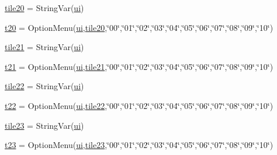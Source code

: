\begin{DoxyCompactItemize}
\item 
\mbox{\hyperlink{namespacegui_a2096e825e084bbcf0aa95f3d23080035}{tile20}} = String\+Var(\mbox{\hyperlink{namespacegui_a40ab7281456eadbea2dc2038f5c24fa1}{ui}})
\item 
\mbox{\hyperlink{namespacegui_a007d194e3cc41d5c441d2839bcc37e82}{t20}} = Option\+Menu(\mbox{\hyperlink{namespacegui_a40ab7281456eadbea2dc2038f5c24fa1}{ui}},\mbox{\hyperlink{namespacegui_a2096e825e084bbcf0aa95f3d23080035}{tile20}},\char`\"{}00\char`\"{},\char`\"{}01\char`\"{},\char`\"{}02\char`\"{},\char`\"{}03\char`\"{},\char`\"{}04\char`\"{},\char`\"{}05\char`\"{},\char`\"{}06\char`\"{},\char`\"{}07\char`\"{},\char`\"{}08\char`\"{},\char`\"{}09\char`\"{},\char`\"{}10\char`\"{})
\item 
\mbox{\hyperlink{namespacegui_a498c43445669c1b252d5fcaab91b94d1}{tile21}} = String\+Var(\mbox{\hyperlink{namespacegui_a40ab7281456eadbea2dc2038f5c24fa1}{ui}})
\item 
\mbox{\hyperlink{namespacegui_a5966de5cb8f4ee1c0c9351cc875b9ade}{t21}} = Option\+Menu(\mbox{\hyperlink{namespacegui_a40ab7281456eadbea2dc2038f5c24fa1}{ui}},\mbox{\hyperlink{namespacegui_a498c43445669c1b252d5fcaab91b94d1}{tile21}},\char`\"{}00\char`\"{},\char`\"{}01\char`\"{},\char`\"{}02\char`\"{},\char`\"{}03\char`\"{},\char`\"{}04\char`\"{},\char`\"{}05\char`\"{},\char`\"{}06\char`\"{},\char`\"{}07\char`\"{},\char`\"{}08\char`\"{},\char`\"{}09\char`\"{},\char`\"{}10\char`\"{})
\item 
\mbox{\hyperlink{namespacegui_a70aa21cb6ac54c9f4b78b33bb1b2a950}{tile22}} = String\+Var(\mbox{\hyperlink{namespacegui_a40ab7281456eadbea2dc2038f5c24fa1}{ui}})
\item 
\mbox{\hyperlink{namespacegui_ae55c578f963d2fb950b90472aefb2568}{t22}} = Option\+Menu(\mbox{\hyperlink{namespacegui_a40ab7281456eadbea2dc2038f5c24fa1}{ui}},\mbox{\hyperlink{namespacegui_a70aa21cb6ac54c9f4b78b33bb1b2a950}{tile22}},\char`\"{}00\char`\"{},\char`\"{}01\char`\"{},\char`\"{}02\char`\"{},\char`\"{}03\char`\"{},\char`\"{}04\char`\"{},\char`\"{}05\char`\"{},\char`\"{}06\char`\"{},\char`\"{}07\char`\"{},\char`\"{}08\char`\"{},\char`\"{}09\char`\"{},\char`\"{}10\char`\"{})
\item 
\mbox{\hyperlink{namespacegui_afd8283fde2bbc574d953eeedbcfdcedb}{tile23}} = String\+Var(\mbox{\hyperlink{namespacegui_a40ab7281456eadbea2dc2038f5c24fa1}{ui}})
\item 
\mbox{\hyperlink{namespacegui_a0414c77dd058a679fbc1b6536aa4340c}{t23}} = Option\+Menu(\mbox{\hyperlink{namespacegui_a40ab7281456eadbea2dc2038f5c24fa1}{ui}},\mbox{\hyperlink{namespacegui_afd8283fde2bbc574d953eeedbcfdcedb}{tile23}},\char`\"{}00\char`\"{},\char`\"{}01\char`\"{},\char`\"{}02\char`\"{},\char`\"{}03\char`\"{},\char`\"{}04\char`\"{},\char`\"{}05\char`\"{},\char`\"{}06\char`\"{},\char`\"{}07\char`\"{},\char`\"{}08\char`\"{},\char`\"{}09\char`\"{},\char`\"{}10\char`\"{})

\end{DoxyCompactItemize}
